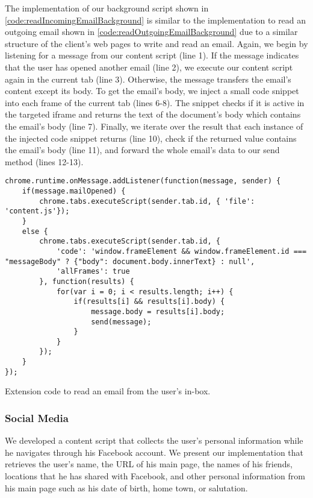 	The implementation of our background script shown in \autoref{code:readIncomingEmailBackground} is similar to the implementation to read an outgoing email shown in \autoref{code:readOutgoingEmailBackground} due to a similar structure of the client's web pages to write and read an email. Again, we begin by listening for a message from our content script (line 1). If the message indicates that the user has opened another email (line 2), we execute our content script again in the current tab (line 3). Otherwise, the message transfers the email's content except its body. To get the email's body, we inject a small code snippet into each frame of the current tab (lines 6-8). The snippet checks if it is active in the targeted iframe and returns the text of the document's body which contains the email's body (line 7). Finally, we iterate over the result that each instance of the injected code snippet returns (line 10), check if the returned value contains the email's body (line 11), and forward the whole email's data to our send method (lines 12-13).
	
	\begin{code}
		\begin{lstlisting}
chrome.runtime.onMessage.addListener(function(message, sender) {
	if(message.mailOpened) {
		chrome.tabs.executeScript(sender.tab.id, { 'file': 'content.js'});
	}
	else {
		chrome.tabs.executeScript(sender.tab.id, {
			'code': 'window.frameElement && window.frameElement.id === "messageBody" ? {"body": document.body.innerText} : null',
			'allFrames': true
		}, function(results) {
			for(var i = 0; i < results.length; i++) {
				if(results[i] && results[i].body) {
					message.body = results[i].body;
					send(message);
				}
			}
		});
	}
});
\end{lstlisting}
		\caption{Extension code to read an email from the user's in-box.}
		\label{code:readIncomingEmailBackground}
	\end{code}
	

\subsubsection{Social Media}

	We developed a content script that collects the user's personal information while he navigates through his Facebook account. We present our implementation that retrieves the user's name, the URL of his main page, the names of his friends, locations that he has shared with Facebook, and other personal information from his main page such as his date of birth, home town, or salutation.
	
